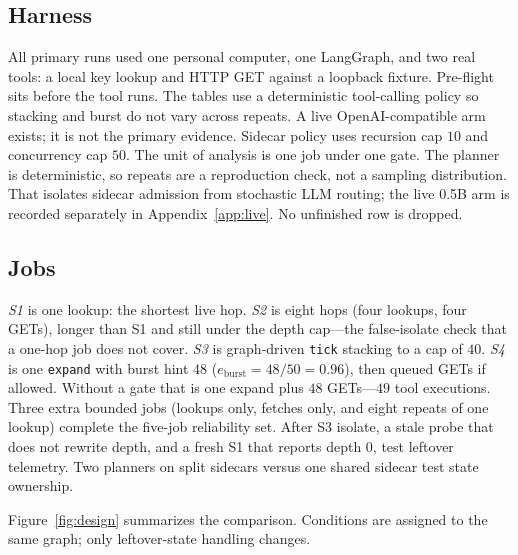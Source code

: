 \documentclass[11pt,a4paper]{article}
\begin{document}
\subsection{Harness}
\label{sec:harness}

All primary runs used one personal computer, one LangGraph, and two real tools: a local key lookup and HTTP GET against a loopback fixture.
Pre-flight sits before the tool runs.
The tables use a deterministic tool-calling policy so stacking and burst do not vary across repeats.
A live OpenAI-compatible arm exists; it is not the primary evidence.
Sidecar policy uses recursion cap $10$ and concurrency cap $50$.
The unit of analysis is one job under one gate.
The planner is deterministic, so repeats are a reproduction check, not a sampling distribution.
That isolates sidecar admission from stochastic LLM routing; the live 0.5B arm is recorded separately in Appendix~\ref{app:live}.
No unfinished row is dropped.

\subsection{Jobs}
\label{sec:jobs}

\emph{S1} is one lookup: the shortest live hop.
\emph{S2} is eight hops (four lookups, four GETs), longer than S1 and still under the depth cap---the false-isolate check that a one-hop job does not cover.
\emph{S3} is graph-driven \texttt{tick} stacking to a cap of $40$.
\emph{S4} is one \texttt{expand} with burst hint $48$ ($e_{\mathrm{burst}}=48/50=0.96$), then queued GETs if allowed.
Without a gate that is one expand plus $48$ GETs---$49$ tool executions.
Three extra bounded jobs (lookups only, fetches only, and eight repeats of one lookup) complete the five-job reliability set.
After S3 isolate, a stale probe that does not rewrite depth, and a fresh S1 that reports depth $0$, test leftover telemetry.
Two planners on split sidecars versus one shared sidecar test state ownership.

Figure~\ref{fig:design} summarizes the comparison.
Conditions are assigned to the same graph; only leftover-state handling changes.
\end{document}
